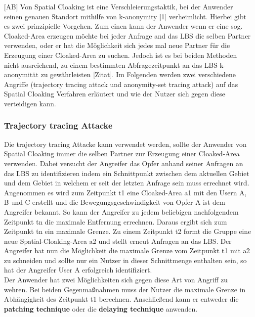 [AB] Von Spatial Cloaking ist eine Verschleierungstaktik, bei der Anwender seinen genauen Standort mithilfe von k-anonymity [1] verheimlicht. Hierbei gibt es zwei prinzipielle Vorgehen. Zum einen kann der Anwender wenn er eine sog. Cloaked-Area erzeugen möchte bei jeder Anfrage and das LBS die selben Partner verwenden, oder er hat die Möglichkeit sich jedes mal neue Partner für die Erzeugung einer Cloaked-Area zu suchen. Jedoch ist es bei beiden Methoden nicht ausreichend, zu einem bestimmten Abfragezeitpunkt an das LBS k-anonymität zu gewährleisten [Zitat]. Im Folgenden werden zwei verschiedene Angriffe (trajectory tracing attack und anonymity-set tracing attack) auf das Spatial Cloaking Verfahren erläutert und wie der Nutzer sich gegen diese verteidigen kann. 
\subsubsection{Trajectory tracing Attacke}
Die trajectory tracing Attacke kann verwendet werden, sollte der Anwender von Spatial Cloaking immer die selben Partner zur Erzeugung einer Cloaked-Area verwenden. Dabei versucht der Angreifer das Opfer anhand seiner Anfragen an das LBS zu identifizieren indem ein Schnittpunkt zwischen dem aktuellen Gebiet und dem Gebiet in welchem er seit der letzten Anfrage sein muss errechnet wird. Angenommen es wird zum Zeitpunkt t1 eine Cloaked-Area a1 mit den Usern A, B und C erstellt und die Bewegungsgeschwindigkeit von Opfer A ist dem Angreifer bekannt. So kann der Angreifer zu jedem beliebigen nachfolgendem Zeitpunkt tn die maximale Entfernung errechnen. Daraus ergibt sich zum Zeitpunkt tn ein maximale Grenze. Zu einem Zeitpunkt t2 formt die Gruppe eine neue Spatial-Cloaking-Area a2 und stellt erneut Anfragen an das LBS. Der Angreifer hat nun die Möglichkeit die maximale Grenze vom Zeitpunkt t1 mit a2 zu schneiden und sollte nur ein Nutzer in dieser Schnittmenge enthalten sein, so hat der Angreifer User A erfolgreich identifiziert.\\ 
Der Anwender hat zwei Möglichkeiten sich gegen diese Art von Angriff zu wehren. Bei beiden Gegenmaßnahmen muss der Nutzer die maximale Grenze in Abhängigkeit des Zeitpunkt t1 berechnen. Anschließend kann er entweder die \textbf{patching technique} oder die \textbf{delaying technique} anwenden.
